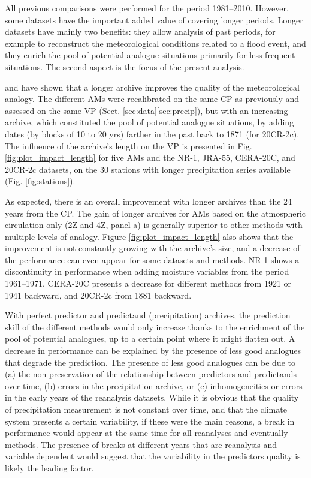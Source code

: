 \documentclass{ametsoc}
\begin{document}
All previous comparisons were performed for the period 1981--2010. However, some datasets have the important added value of covering longer periods. Longer datasets have mainly two benefits: they allow analysis of past periods, for example to reconstruct the meteorological conditions related to a flood event, and they enrich the pool of potential analogue situations primarily for less frequent situations. The second aspect is the focus of the present analysis. 

\citet{Ruosteenoja1988} and \citet{Vandendool1994} have shown that a longer archive improves the quality of the meteorological analogy. The different AMs were recalibrated on the same CP as previously and assessed on the same VP (Sect. \ref{sec:data}\ref{sec:precip}), but with an increasing archive, which constituted the pool of potential analogue situations, by adding dates (by blocks of 10 to 20 yrs) farther in the past back to 1871 (for 20CR-2c). The influence of the archive's length on the VP is presented in Fig. \ref{fig:plot_impact_length} for five AMs and the NR-1, JRA-55, CERA-20C, and 20CR-2c datasets, on the 30 stations with longer precipitation series available (Fig. \ref{fig:stations}). 

As expected, there is an overall improvement with longer archives than the 24 years from the CP. The gain of longer archives for AMs based on the atmospheric circulation only (2Z and 4Z, panel a) is generally superior to other methods with multiple levels of analogy. Figure \ref{fig:plot_impact_length} also shows that the improvement is not constantly growing with the archive's size, and a decrease of the performance can even appear for some datasets and methods. NR-1 shows a discontinuity in performance when adding moisture variables from the period 1961--1971, CERA-20C presents a decrease for different methods from 1921 or 1941 backward, and 20CR-2c from 1881 backward.

With perfect predictor and predictand (precipitation) archives, the prediction skill of the different methods would only increase thanks to the enrichment of the pool of potential analogues, up to a certain point where it might flatten out. A decrease in performance can be explained by the presence of less good analogues that degrade the prediction. The presence of less good analogues can be due to (a) the non-preservation of the relationship between predictors and predictands over time, (b) errors in the precipitation archive, or (c) inhomogeneities or errors in the early years of the reanalysis datasets. While it is obvious that the quality of precipitation measurement is not constant over time, and that the climate system presents a certain variability, if these were the main reasons, a break in performance would appear at the same time for all reanalyses and eventually methods. The presence of breaks at different years that are reanalysis and variable dependent would suggest that the variability in the predictors quality is likely the leading factor.
\end{document}
